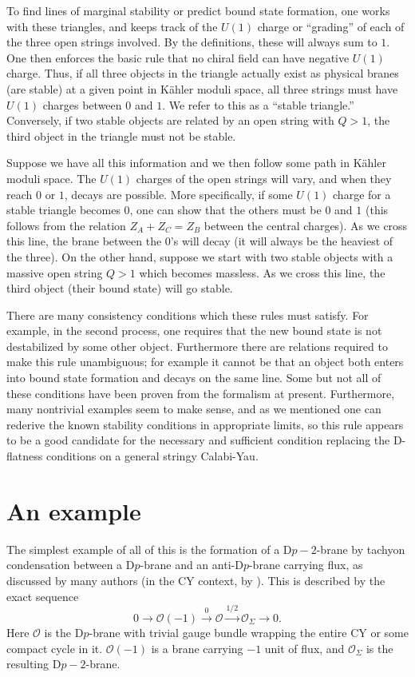 \documentclass[a4paper,12pt]{amsart}
\numberwithin{equation}{section}
\theoremstyle{plain}
\theoremstyle{definition}
\def\mapr{\mathop{\longrightarrow}\limits}
\def\cal{\mathcal}
\def\CO{{\cal O}}
\begin{document}
To find lines of marginal stability or predict bound state formation,
one works with these triangles, and keeps track of the $U(1)$ charge
or ``grading'' of each of the three open strings involved.  By the
definitions, these will always sum to $1$.  One then enforces the
basic rule that no chiral field can have negative $U(1)$ charge.
Thus, if all three objects in the triangle actually exist as physical
branes (are stable) at a given point in K\"ahler moduli space, all
three strings must have $U(1)$ charges between $0$ and $1$.  We refer
to this as a ``stable triangle.''  Conversely, if two stable objects
are related by an open string with $Q>1$, the third object in the
triangle must not be stable.

Suppose we have all this information and we then follow some path in
K\"ahler moduli space.  The $U(1)$ charges of the open strings will
vary, and when they reach $0$ or $1$, decays are possible.  More
specifically, if some $U(1)$ charge for a stable triangle becomes $0$,
one can show that the others must be $0$ and $1$ (this follows from the
relation $Z_A + Z_C = Z_B$ between the central charges).  As we cross
this line, the brane between the $0$'s will decay (it will always be
the heaviest of the three).  On the other hand, suppose we start with
two stable objects with a massive open string $Q>1$ which becomes massless.
As we cross this line, the third object (their bound state) will go stable.

There are many consistency conditions which these rules must satisfy.
For example, in the second process, one requires that the new bound state
is not destabilized by some other object.  Furthermore there are relations
required to make this rule unambiguous; for example it cannot be that
an object both enters into bound state formation and decays on the same
line.  Some but not all of these conditions have been proven from the
formalism at present.  Furthermore, many nontrivial examples seem
to make sense, and as we mentioned one can rederive the known stability
conditions in appropriate limits, so this rule appears to be a good
candidate for the necessary and sufficient condition replacing the
D-flatness conditions on a general stringy Calabi-Yau.

\section{An example}

The simplest example of all of this is the formation of a D$p-2$-brane
by tachyon condensation between a D$p$-brane and an anti-D$p$-brane
carrying flux, as discussed by many authors (in the CY context, by
\cite{OPW}).  This is described by the exact sequence
\begin{equation}
0 \mapr \CO(-1) \mapr^0 \CO \mapr^{1/2} \CO_\Sigma \mapr 0 .
\end{equation}
Here $\CO$ is the D$p$-brane with trivial gauge bundle wrapping the entire
CY or some compact cycle in it.  $\CO(-1)$ is a brane carrying $-1$ unit
of flux, and $\CO_\Sigma$ is the resulting D$p-2$-brane.
\end{document}
